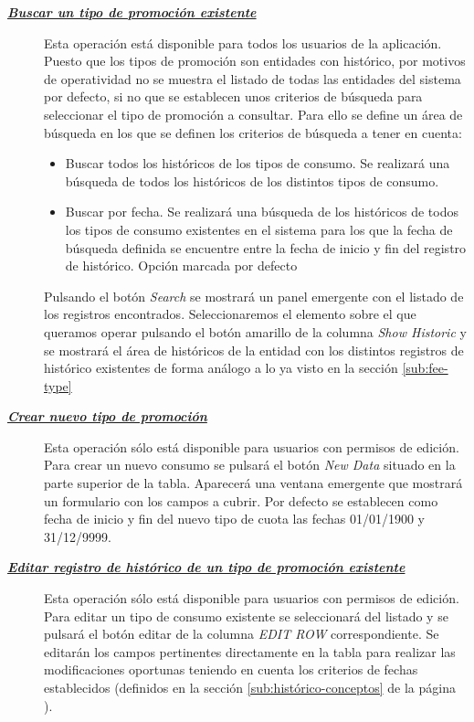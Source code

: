 \begin{description}
\item[\underline{\textsl{\textbf{Buscar un tipo de promoción existente}}}] Esta operación está disponible para todos los usuarios de la aplicación.
Puesto que los tipos de promoción son entidades con histórico, por motivos de operatividad no se muestra el listado de todas las entidades del sistema por defecto, si no que se establecen unos criterios de búsqueda para seleccionar el tipo de promoción a consultar. Para ello se define un área de búsqueda en los que se definen los criterios de búsqueda a tener en cuenta:
\begin{itemize}
\item Buscar todos los históricos de los tipos de consumo. Se realizará una búsqueda de todos los históricos de los distintos tipos de consumo.
\item Buscar por fecha. Se realizará una búsqueda de los históricos de todos los tipos de consumo existentes en el sistema para los que la fecha de búsqueda definida se encuentre entre la fecha de inicio y fin del registro de histórico. Opción marcada por defecto
\end{itemize}

Pulsando el botón \emph{Search} se mostrará un panel emergente con el listado de los registros encontrados. Seleccionaremos el elemento sobre el que queramos operar pulsando el botón amarillo de la columna \emph{Show Historic} y se mostrará el área de históricos de la entidad con los distintos registros de histórico existentes de forma análogo a lo ya visto en la sección \ref{sub:fee-type}

\item[\underline{\textsl{\textbf{Crear nuevo tipo de promoción}}}] Esta operación sólo está disponible para usuarios con permisos de edición.
Para crear un nuevo consumo se pulsará el botón \textit{New Data} situado en la parte superior de la tabla. Aparecerá una ventana emergente que mostrará un formulario con los campos a cubrir. Por defecto se establecen como fecha de inicio y fin del nuevo tipo de cuota las fechas 01/01/1900 y 31/12/9999.

\item[\underline{\textsl{\textbf{Editar registro de histórico de un tipo de promoción existente}}}] Esta operación sólo está disponible para usuarios con permisos de edición.
Para editar un tipo de consumo existente se seleccionará del listado y se pulsará el botón editar de la columna \textit{EDIT ROW} correspondiente. Se editarán los campos pertinentes directamente en la tabla para realizar las modificaciones oportunas teniendo en cuenta los criterios de fechas establecidos (definidos en la sección \ref{sub:histórico-conceptos} de la página \pageref{sub:histórico-conceptos}).


\end{description}
